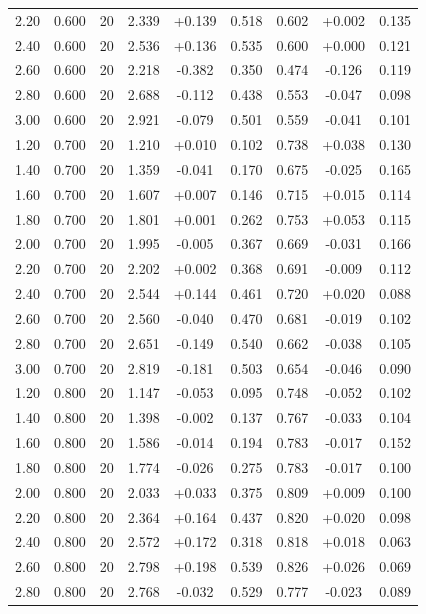 \begin{longtable}{ccccccccc}
2.20 & 0.600 & 20 & 2.339 & +0.139 & 0.518 & 0.602 & +0.002 & 0.135 \\
2.40 & 0.600 & 20 & 2.536 & +0.136 & 0.535 & 0.600 & +0.000 & 0.121 \\
2.60 & 0.600 & 20 & 2.218 & -0.382 & 0.350 & 0.474 & -0.126 & 0.119 \\
2.80 & 0.600 & 20 & 2.688 & -0.112 & 0.438 & 0.553 & -0.047 & 0.098 \\
3.00 & 0.600 & 20 & 2.921 & -0.079 & 0.501 & 0.559 & -0.041 & 0.101 \\
1.20 & 0.700 & 20 & 1.210 & +0.010 & 0.102 & 0.738 & +0.038 & 0.130 \\
1.40 & 0.700 & 20 & 1.359 & -0.041 & 0.170 & 0.675 & -0.025 & 0.165 \\
1.60 & 0.700 & 20 & 1.607 & +0.007 & 0.146 & 0.715 & +0.015 & 0.114 \\
1.80 & 0.700 & 20 & 1.801 & +0.001 & 0.262 & 0.753 & +0.053 & 0.115 \\
2.00 & 0.700 & 20 & 1.995 & -0.005 & 0.367 & 0.669 & -0.031 & 0.166 \\
2.20 & 0.700 & 20 & 2.202 & +0.002 & 0.368 & 0.691 & -0.009 & 0.112 \\
2.40 & 0.700 & 20 & 2.544 & +0.144 & 0.461 & 0.720 & +0.020 & 0.088 \\
2.60 & 0.700 & 20 & 2.560 & -0.040 & 0.470 & 0.681 & -0.019 & 0.102 \\
2.80 & 0.700 & 20 & 2.651 & -0.149 & 0.540 & 0.662 & -0.038 & 0.105 \\
3.00 & 0.700 & 20 & 2.819 & -0.181 & 0.503 & 0.654 & -0.046 & 0.090 \\
1.20 & 0.800 & 20 & 1.147 & -0.053 & 0.095 & 0.748 & -0.052 & 0.102 \\
1.40 & 0.800 & 20 & 1.398 & -0.002 & 0.137 & 0.767 & -0.033 & 0.104 \\
1.60 & 0.800 & 20 & 1.586 & -0.014 & 0.194 & 0.783 & -0.017 & 0.152 \\
1.80 & 0.800 & 20 & 1.774 & -0.026 & 0.275 & 0.783 & -0.017 & 0.100 \\
2.00 & 0.800 & 20 & 2.033 & +0.033 & 0.375 & 0.809 & +0.009 & 0.100 \\
2.20 & 0.800 & 20 & 2.364 & +0.164 & 0.437 & 0.820 & +0.020 & 0.098 \\
2.40 & 0.800 & 20 & 2.572 & +0.172 & 0.318 & 0.818 & +0.018 & 0.063 \\
2.60 & 0.800 & 20 & 2.798 & +0.198 & 0.539 & 0.826 & +0.026 & 0.069 \\
2.80 & 0.800 & 20 & 2.768 & -0.032 & 0.529 & 0.777 & -0.023 & 0.089 \\

\end{longtable}
